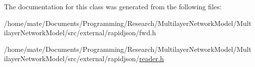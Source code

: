 The documentation for this class was generated from the following files\+:\begin{DoxyCompactItemize}
\item 
/home/mate/\+Documents/\+Programming/\+Research/\+Multilayer\+Network\+Model/\+Multilayer\+Network\+Model/src/external/rapidjson/fwd.\+h\item 
/home/mate/\+Documents/\+Programming/\+Research/\+Multilayer\+Network\+Model/\+Multilayer\+Network\+Model/src/external/rapidjson/\hyperlink{reader_8h}{reader.\+h}\end{DoxyCompactItemize}
